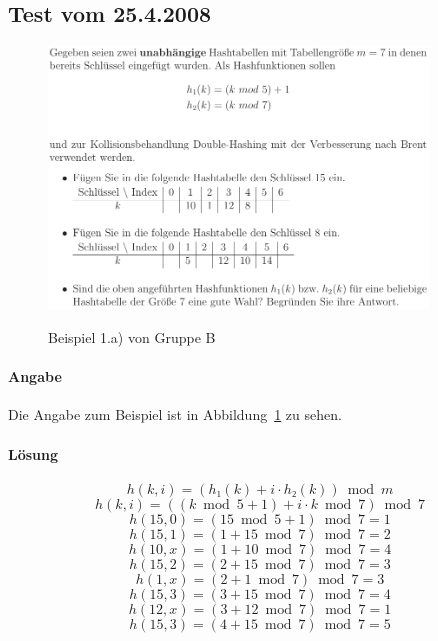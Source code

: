 \documentclass[a4paper, 12pt]{article}
\begin{document}
\subsection{Test vom 25.4.2008}

\begin{figure}[htbp]
	\caption{Beispiel 1.a) von Gruppe B}
	\vskip 0.2cm
	\centering
	\includegraphics[width=0.9\textwidth]{Figures/Test_2010-01-14_1Ba}
	\label{figure:Test_2010-01-14_1Ba}
\end{figure}

\paragraph{Angabe}

Die Angabe zum Beispiel ist in Abbildung~\ref{figure:Test_2010-01-14_1Ba} zu sehen.

\paragraph{Lösung}

\[ 
	h\left(k, i\right) = 
	\left( h₁\left(k\right) + i ⋅ h₂\left(k\right) \right) \bmod{m}
\]
\[ 
	h\left(k, i \right) = 
	\left( \left( k \bmod{5} + 1 \right) + i ⋅ k \bmod{7} \right) \bmod{7}
\]
\[ 
	h\left(15, 0 \right) = 
	\left( 15 \bmod{5} +1 \right) \bmod{7} = 1
\]
\[ 
	h\left(15, 1 \right) = 
	\left( 1 + 15 \bmod{7} \right) \bmod{7} = 2
\]
\[ 
	h\left(10, x \right) = 
	\left( 1 + 10 \bmod{7} \right) \bmod{7} = 4
\]
\[ 
	h\left(15, 2 \right) = 
	\left( 2 + 15 \bmod{7} \right) \bmod{7} = 3
\]
\[ 
	h\left(1, x \right) = 
	\left( 2 + 1 \bmod{7} \right) \bmod{7} = 3
\]
\[ 
	h\left(15, 3 \right) = 
	\left( 3 + 15 \bmod{7} \right) \bmod{7} = 4
\]
\[ 
	h\left(12, x \right) = 
	\left( 3 + 12 \bmod{7} \right) \bmod{7} = 1
\]
\[ 
	h\left(15, 3 \right) = 
	\left( 4 + 15 \bmod{7} \right) \bmod{7} = 5
\]
\end{document}
